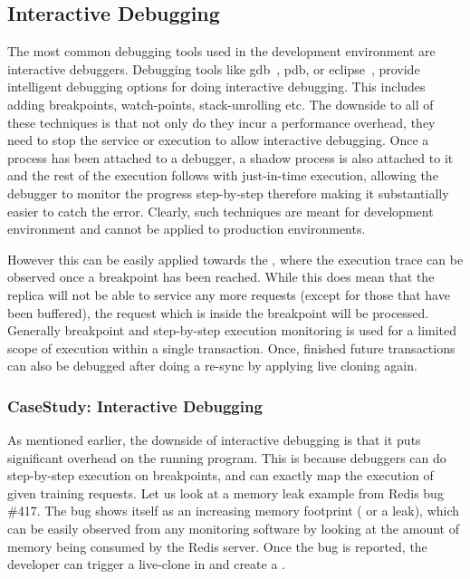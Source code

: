 \subsection{Interactive Debugging}

The most common debugging tools used in the development environment are interactive debuggers. 
Debugging tools like gdb~\cite{gdb}, pdb, or eclipse~\cite{eclipse}, provide intelligent debugging options for doing interactive debugging. 
This includes adding breakpoints, watch-points, stack-unrolling etc.
The downside to all of these techniques is that not only do they incur a performance overhead, they need to stop the service or execution to allow interactive debugging.
Once a process has been attached to a debugger, a shadow process is also attached to it and the rest of the execution follows with just-in-time execution, allowing the debugger to monitor the progress step-by-step therefore making it substantially easier to catch the error.
Clearly, such techniques are meant for development environment and cannot be applied to production environments.

However this can be easily applied towards the \debugcontainer, where the execution trace can be observed once a breakpoint has been reached.
While this does mean that the replica will not be able to service any more requests (except for those that have been buffered), the request which is inside the breakpoint will be processed.
Generally breakpoint and step-by-step execution monitoring is used for a limited scope of execution within a single transaction.
Once, finished future transactions can also be debugged after doing a re-sync by applying live cloning again.

\subsubsection{CaseStudy: Interactive Debugging}

As mentioned earlier, the downside of interactive debugging is that it puts significant overhead on the running program.
This is because debuggers can do step-by-step execution on breakpoints, and can exactly map the execution of given training requests.
Let us look at a memory leak example from Redis bug \#417. 
The bug shows itself as an increasing memory footprint ( or a leak), which can be easily observed from any monitoring software by looking at the amount of memory being consumed by the Redis server.
Once the bug is reported, the developer can trigger a live-clone in \parikshan and create a \debugcontainer.

